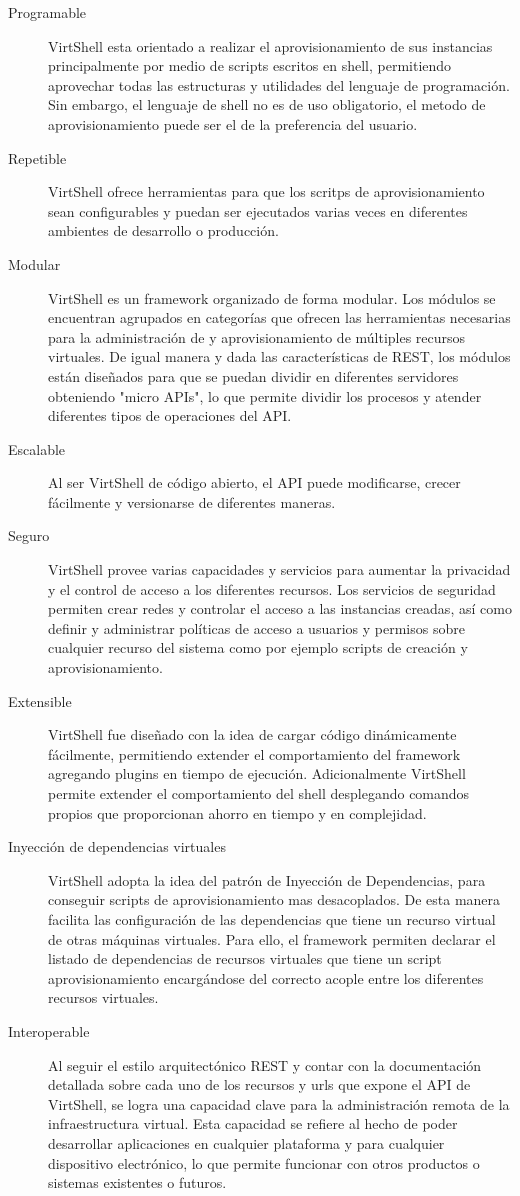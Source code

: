 \begin{description}
\item [Programable] VirtShell esta orientado a realizar el aprovisionamiento de sus instancias principalmente por medio de scripts escritos en shell, permitiendo aprovechar todas las estructuras y utilidades del lenguaje de programación. Sin embargo, el lenguaje de shell no es de uso obligatorio, el  metodo de aprovisionamiento puede ser el de la preferencia del usuario. 
\item [Repetible] VirtShell ofrece herramientas para que los scritps de aprovisionamiento sean configurables y  puedan ser ejecutados varias veces en diferentes ambientes de desarrollo o producción.
\item [Modular] VirtShell es un framework organizado de forma modular. Los módulos se encuentran agrupados en categorías que ofrecen las herramientas necesarias para la administración de y aprovisionamiento de múltiples recursos virtuales. De igual manera y dada las características de REST, los módulos están diseñados para que se puedan dividir en diferentes servidores obteniendo "micro APIs", lo que permite dividir los procesos y atender diferentes tipos de operaciones del API. 
\item [Escalable] Al ser VirtShell de código abierto, el API puede modificarse, crecer fácilmente y versionarse de diferentes maneras. 
\item [Seguro] VirtShell provee varias capacidades y servicios para aumentar la privacidad y el control de acceso a los diferentes recursos. Los servicios de seguridad permiten crear redes y controlar el acceso a las instancias creadas, así como definir y administrar políticas de acceso a usuarios y permisos sobre cualquier recurso del sistema como por ejemplo scripts de creación y aprovisionamiento.
\item [Extensible] VirtShell fue diseñado con la idea de cargar código dinámicamente fácilmente, permitiendo extender el comportamiento del framework agregando plugins en tiempo de ejecución.  Adicionalmente VirtShell permite extender el comportamiento del shell desplegando comandos propios que proporcionan ahorro en tiempo y en complejidad.
\item [Inyección de dependencias virtuales] VirtShell adopta la idea del patrón de Inyección de Dependencias, para conseguir scripts de aprovisionamiento mas desacoplados. De esta manera facilita las configuración de las dependencias que tiene un recurso virtual de otras máquinas virtuales. Para ello, el framework permiten declarar el listado de dependencias de recursos virtuales que tiene un script aprovisionamiento encargándose del correcto acople entre los diferentes recursos virtuales.
\item [Interoperable] Al seguir el estilo arquitectónico REST y contar con la documentación detallada sobre cada uno de los recursos y urls que expone el API de VirtShell, se logra una capacidad clave para la administración remota de la infraestructura virtual. Esta capacidad se refiere al hecho de poder desarrollar aplicaciones en cualquier plataforma y para cualquier dispositivo electrónico, lo que permite funcionar con otros productos o sistemas existentes o futuros.


\end{description}
